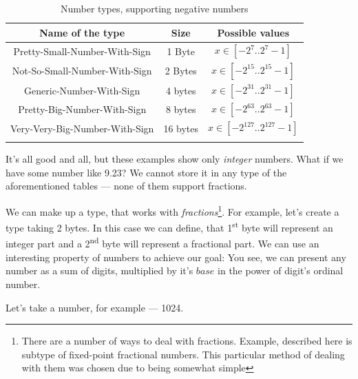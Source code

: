 \documentclass{report}
\begin{document}
            \begin{table}[H]
                \centering
                \begin{longtable}{|c|c|c|}
                    \hline
                    Name of the type & Size & Possible values \\\hline
                    Pretty-Small-Number-With-Sign & 1 Byte & $x \in [-2^7..2^7 - 1]$ \\\hline
                    Not-So-Small-Number-With-Sign & 2 Bytes & $x \in [-2^{15}..2^{15} - 1]$\\\hline
                    Generic-Number-With-Sign & 4 bytes & $x \in [-2^{31}..2^{31} - 1]$\\\hline
                    Pretty-Big-Number-With-Sign & 8 bytes & $x \in [-2^{63}..2^{63} - 1]$\\\hline
                    Very-Very-Big-Number-With-Sign & 16 bytes & $x \in [-2^{127}..2^{127} - 1]$\\\hline
                    \caption{Number types, supporting negative numbers}

                \end{longtable}
            \end{table}

            It's all good and all, but these examples show only \emph{integer} numbers. What if we have some number like 9.23?
            We cannot store it in any type of the aforementioned tables --- none of them support fractions. \par

            We can make up a type, that works with \emph{fractions}\footnote{There are a number of ways to deal with fractions. 
            Example, described here is subtype of fixed-point fractional numbers. This particular method of dealing with them was chosen due to being somewhat simple}. 
            For example, let's create a type taking 2 bytes. In this case we can define, that 1\textsuperscript{st} byte will represent an integer part and a 2\textsuperscript{nd}
            byte will represent a fractional part. We can use an interesting property of numbers to achieve our goal: You see, we can present any number as a sum of digits,
            multiplied by it's \emph{$base$} in the power of digit's ordinal number. \par
            
            Let's take a number, for example --- 1024. 
            
\end{document}
